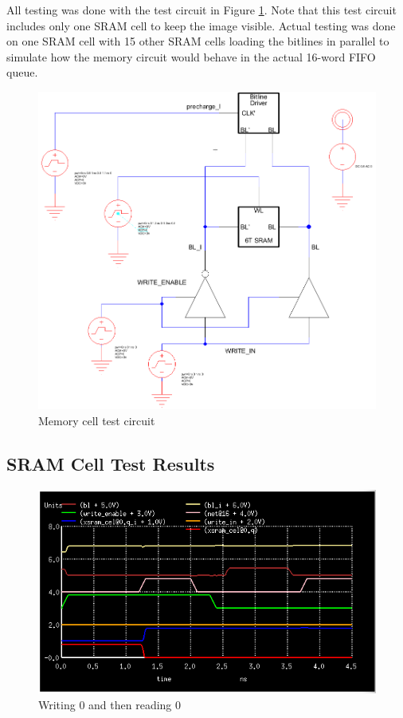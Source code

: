 \documentclass[12pt]{report}
\begin{document}
All testing was done with the test circuit in Figure \ref{fig:test_circuit}. Note that this test circuit includes only one SRAM cell to keep the image visible. Actual testing was done on one SRAM cell with 15 other SRAM cells loading the bitlines in parallel to simulate how the memory circuit would behave in the actual 16-word FIFO queue.

\begin{figure}[H]
  \centering
    \includegraphics[width=1.0\textwidth]{test_circuit.PNG}
  \caption{Memory cell test circuit}
  \label{fig:test_circuit}
\end{figure}

\subsection*{SRAM Cell Test Results}
\begin{figure}[H]
  \centering
    \includegraphics[width=1.0\textwidth]{write_0_then_read_0.png}
  \caption{Writing 0 and then reading 0}
  \label{fig:write_0_then_read_0}
\end{figure}
\end{document}
